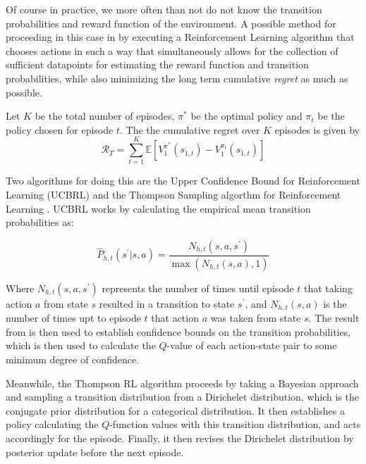 \documentclass{mldsmsc}
\begin{document}
Of course in practice, we more often than not do not know the transition probabilities and
reward function of the environment. A possible method for proceeding in this case in by executing a Reinforcement Learning
algorithm that chooses actions in such a way that simultaneously allows for the collection of sufficient
datapoints for estimating the reward function and transition probabilities, while also minimizing
the long term cumulative \emph{regret} as much as possible.

\begin{definition}\label{def:regret}
Let $K$ be the total number of episodes, $\pi^*$ be the optimal policy and $\pi_t$ be
the policy chosen for episode $t$. The the cumulative regret over $K$ episodes is given by
\begin{equation}
    \mathcal{R}_T = \sum_{t=1}^K \mathbb{E}\left[ V_1^{\pi^*}(s_{1,t}) - V_1^{\pi_t}(s_{1,t})\right]
\end{equation}
\end{definition}

Two algorithms for doing this are the Upper Confidence Bound for Reinforcement Learning (UCBRL)
\citep{RefWorks:auer2008near-optimal} and the Thompson Sampling algorthm for Reinforcement
Learning \citep{RefWorks:pike-burke2024optimism/thompson}. UCBRL works by calculating the
empirical mean transition probabilities as:

\[
\hat{P}_{h,t}(s^\prime|s,a) = \frac{N_{h,t}(s,a,s^\prime)}{\max \left( N_{h,t}(s,a),1\right)}
\]

Where $N_{h,t}(s,a,s^\prime)$ represents the number of times until episode $t$ that taking action
$a$ from state $s$ resulted in a transition to state $s^\prime$, and $N_{h,t}(s,a)$ is the number
of times upt to episode $t$ that action $a$ was taken from state $s$. The result from \cite{RefWorks:weissman2003inequalities}
is then used to establish confidence bounds on the transition probabilities, which is then used to
calculate the $Q$-value of each action-state pair to some minimum degree of confidence.

Meanwhile, the Thompson RL algorithm \citep{RefWorks:pike-burke2024optimism/thompson} proceeds by
taking a Bayesian approach and sampling a transition distribution from a Dirichelet distribution, which is the conjugate prior distribution
for a categorical distribution. It then establishes a policy calculating the $Q$-function values
with this transition distribution, and acts accordingly for the episode. Finally, it then revises the
Dirichelet distribution by posterior update before the next episode.
\end{document}
